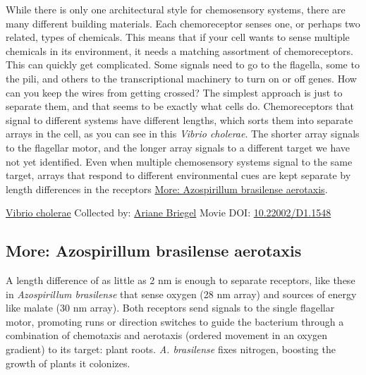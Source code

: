 \documentclass[]{tufte-book}
\begin{document}
While there is only one architectural style for chemosensory systems, there are many different building materials. Each chemoreceptor senses one, or perhaps two related, types of chemicals. This means that if your cell wants to sense multiple chemicals in its environment, it needs a matching assortment of chemoreceptors. This can quickly get complicated. Some signals need to go to the flagella, some to the pili, and others to the transcriptional machinery to turn on or off genes. How can you keep the wires from getting crossed? The simplest approach is just to separate them, and that seems to be exactly what cells do. Chemoreceptors that signal to different systems have different lengths, which sorts them into separate arrays in the cell, as you can see in this \emph{Vibrio cholerae}. The shorter array signals to the flagellar motor, and the longer array signals to a different target we have not yet identified. Even when multiple chemosensory systems signal to the same target, arrays that respond to different environmental cues are kept separate by length differences in the receptors \protect\hyperlink{Azospirillum_brasilense_aerotaxis}{More: Azospirillum brasilense aerotaxis}.



\hypertarget{htmlwidget-f0cc0cc8d34ee6bc474c}{}

\label{fig:7-4}\protect\hyperlink{tree}{Vibrio cholerae} Collected by: \protect\hyperlink{ariane_briegel}{Ariane Briegel} Movie DOI: \href{https://doi.org/10.22002/D1.1548}{10.22002/D1.1548}

\hypertarget{Azospirillum_brasilense_aerotaxis}{%
\subsection*{More: Azospirillum brasilense aerotaxis}\label{Azospirillum_brasilense_aerotaxis}}

A length difference of as little as 2 nm is enough to separate receptors, like these in \emph{Azospirillum brasilense} that sense oxygen (28 nm array) and sources of energy like malate (30 nm array). Both receptors send signals to the single flagellar motor, promoting runs or direction switches to guide the bacterium through a combination of chemotaxis and aerotaxis (ordered movement in an oxygen gradient) to its target: plant roots. \emph{A. brasilense} fixes nitrogen, boosting the growth of plants it colonizes.
\end{document}
